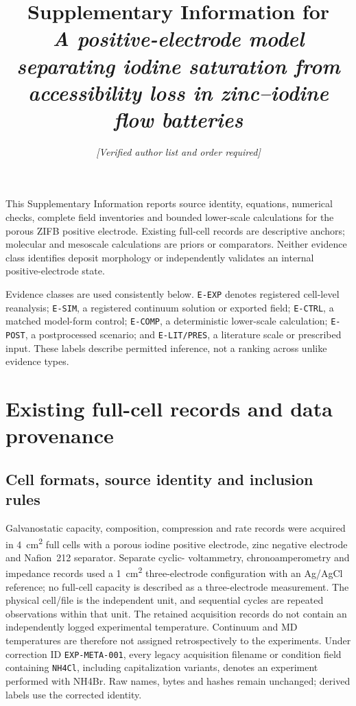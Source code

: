 \documentclass[11pt]{article}
\title{\bfseries Supplementary Information for\\[3pt]
\textit{A positive-electrode model separating iodine saturation from accessibility loss in zinc--iodine flow batteries}}
\author{\textit{[Verified author list and order required]}}
\affil{\textit{[Verified affiliations and corresponding-author details required]}}
\date{}
\let\SIorigsubsection\subsection
\renewcommand{\subsection}{\FloatBarrier\SIorigsubsection}
\begin{document}
\maketitle
\begingroup
\footnotesize
\setlength{\cftbeforesecskip}{1pt}
\setlength{\cftbeforesubsecskip}{0pt}
\tableofcontents
\endgroup
\clearpage

This Supplementary Information reports source identity, equations, numerical checks, complete field
inventories and bounded lower-scale calculations for the porous ZIFB positive electrode. Existing full-cell
records are descriptive anchors; molecular and mesoscale calculations are priors or comparators. Neither
evidence class identifies deposit morphology or independently validates an internal positive-electrode state.

Evidence classes are used consistently below. \texttt{E-EXP} denotes registered cell-level reanalysis;
\texttt{E-SIM}, a registered continuum solution or exported field; \texttt{E-CTRL}, a matched model-form
control; \texttt{E-COMP}, a deterministic lower-scale calculation; \texttt{E-POST}, a postprocessed scenario;
and \texttt{E-LIT/PRES}, a literature scale or prescribed input. These labels describe permitted inference,
not a ranking across unlike evidence types.

\section{Existing full-cell records and data provenance}

\subsection{Cell formats, source identity and inclusion rules}

Galvanostatic capacity, composition, compression and rate records were acquired in \SI{4}{cm^2} full cells
with a porous iodine positive electrode, zinc negative electrode and Nafion~212 separator. Separate cyclic-
voltammetry, chronoamperometry and impedance records used a \SI{1}{cm^2} three-electrode configuration with
an Ag/AgCl reference; no full-cell capacity is described as a three-electrode measurement. The physical
cell/file is the independent unit, and sequential cycles are repeated observations within that unit. The
retained acquisition records do not contain an independently logged experimental temperature. Continuum and
MD temperatures are therefore not assigned retrospectively to the experiments. Under correction ID
\texttt{EXP-META-001}, every legacy acquisition filename or condition field containing \texttt{NH4Cl},
including capitalization variants, denotes an experiment performed with NH4Br. Raw names, bytes and hashes
remain unchanged; derived labels use the corrected identity.
\end{document}
